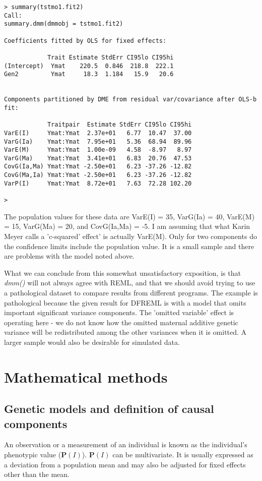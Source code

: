 \documentclass[titlepage]{article}  %
\begin{document}
\begin{verbatim}
> summary(tstmo1.fit2)
Call:
summary.dmm(dmmobj = tstmo1.fit2)

Coefficients fitted by OLS for fixed effects:

            Trait Estimate StdErr CI95lo CI95hi
(Intercept)  Ymat    220.5  0.846  218.8  222.1
Gen2         Ymat     18.3  1.184   15.9   20.6


Components partitioned by DME from residual var/covariance after OLS-b fit:

            Traitpair  Estimate StdErr CI95lo CI95hi
VarE(I)     Ymat:Ymat  2.37e+01   6.77  10.47  37.00
VarG(Ia)    Ymat:Ymat  7.95e+01   5.36  68.94  89.96
VarE(M)     Ymat:Ymat  1.00e-09   4.58  -8.97   8.97
VarG(Ma)    Ymat:Ymat  3.41e+01   6.83  20.76  47.53
CovG(Ia,Ma) Ymat:Ymat -2.50e+01   6.23 -37.26 -12.82
CovG(Ma,Ia) Ymat:Ymat -2.50e+01   6.23 -37.26 -12.82
VarP(I)     Ymat:Ymat  8.72e+01   7.63  72.28 102.20

> 
\end{verbatim}
 
The population values for these data are VarE(I) = 35, VarG(Ia) = 40, VarE(M) = 15, VarG(Ma) = 20, and CovG(Ia,Ma) = -5. I am assuming that what Karin Meyer calls a 'c-squared' effect' is actually VarE(M).  Only for two components do the confidence limits include the population value. It is a small sample and there are problems with the model noted above. 

What we can conclude from this somewhat unsatisfactory exposition, is that {\em dmm()} will not always agree with REML, and that we should avoid trying to use a pathological dataset to compare results from different programs.  The example is pathological because the given result for DFREML is with a model that omits important significant variance components. The 'omitted variable' effect is operating here - we do not know how the omitted maternal additive genetic variance will be redistributed among the other variances when it is omitted. A larger sample would also be desirable for simulated data.


\clearpage
\section{Mathematical methods}

\subsection{Genetic models and definition of causal components}   
\label{sec:genetics}
An observation or a measurement of an individual is known as the individual's phenotypic value (${\bm P(I)}$). ${\bm P(I)}$ can be multivariate. It is usually expressed as a deviation from a population mean and may also be adjusted for fixed effects other than the mean. 
\end{document}
